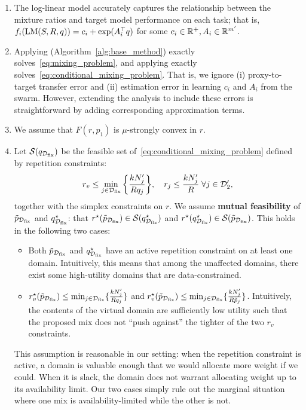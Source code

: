 \begin{assumption}
\begin{enumerate}
    \item The log-linear model accurately captures the relationship between the mixture ratios and target model performance on each task; that is, $f_i(\text{LM}(S, R, q)) = c_i + \exp(A_i^\top q)$ for some $c_i \in \mathbb{R}^+, A_i \in \mathbb{R}^{m'}$.
    \item Applying \base (Algorithm~\ref{alg:base_method}) exactly solves~\eqref{eq:mixing_problem}, and applying \fullmixreuse exactly solves~\eqref{eq:conditional_mixing_problem}. That is, we ignore (i) proxy-to-target transfer error and (ii) estimation error in learning $c_i$ and $A_i$ from the swarm. However, extending the analysis to include these errors is straightforward by adding corresponding approximation terms.
    \item We assume that $F(r, p_1)$ is $\mu$-strongly convex in $r$.
    \item Let $\mathcal{S}(q_{\mathcal{D}_{\text{fix}}})$ be the feasible set of~\eqref{eq:conditional_mixing_problem} defined by repetition constraints:
    \begin{align*}
        r_v \le \min_{j \in \mathcal{D}_{\text{fix}}} \bigg\{\frac{k N_j'}{R q_j}\bigg\}, \quad r_j \le \frac{k N_j'}{R} \; \forall j \in \mathcal{D}_2',
    \end{align*}
    together with the simplex constraints on $r$. We assume \textbf{mutual feasibility} of $\tilde{p}_{\mathcal{D}_{\text{fix}}}$ and $q^\star_{\mathcal{D}_{\text{fix}}}$: that $r^\star(\tilde{p}_{\mathcal{D}_{\text{fix}}}) \in \mathcal{S}(q^\star_{\mathcal{D}_{\text{fix}}})$ and $r^\star(q^\star_{\mathcal{D}_{\text{fix}}}) \in \mathcal{S}(\tilde{p}_{\mathcal{D}_{\text{fix}}})$. This holds in the following two cases:
    \begin{itemize}
        \item Both $\tilde{p}_{\mathcal{D}_{\text{fix}}}$ and $q^\star_{\mathcal{D}_{\text{fix}}}$ have an active repetition constraint on at least one domain. Intuitively, this means that among the unaffected domains, there exist some high-utility domains that are data-constrained.
        \item $r_v^\star(\tilde{p}_{\mathcal{D}_{\text{fix}}}) \le \min_{j \in \mathcal{D}_{\text{fix}}} \{\frac{k N_j'}{ R q_j} \}$ and $r_v^\star(\tilde{p}_{\mathcal{D}_{\text{fix}}}) \le \min_{j \in \mathcal{D}_{\text{fix}}} \{\frac{k N_j'}{ R \tilde{p}_j} \}$. Intuitively, the contents of the virtual domain are sufficiently low utility such that the proposed mix does not ``push against'' the tighter of the two $r_v$ constraints. 
    \end{itemize}
    This assumption is reasonable in our setting: when the repetition constraint is active, a domain is valuable enough that we would allocate more weight if we could. When it is slack, the domain does not warrant allocating weight up to its availability limit. Our two cases simply rule out the marginal situation where one mix is availability-limited while the other is not.
    \end{enumerate}
\end{assumption}


